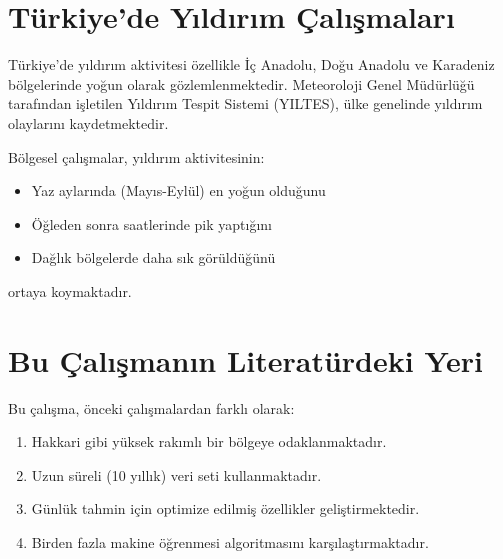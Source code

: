 \section{Türkiye'de Yıldırım Çalışmaları}

Türkiye'de yıldırım aktivitesi özellikle İç Anadolu, Doğu Anadolu ve Karadeniz bölgelerinde yoğun olarak gözlemlenmektedir. Meteoroloji Genel Müdürlüğü tarafından işletilen Yıldırım Tespit Sistemi (YILTES), ülke genelinde yıldırım olaylarını kaydetmektedir.

Bölgesel çalışmalar, yıldırım aktivitesinin:
\begin{itemize}
    \item Yaz aylarında (Mayıs-Eylül) en yoğun olduğunu
    \item Öğleden sonra saatlerinde pik yaptığını
    \item Dağlık bölgelerde daha sık görüldüğünü
\end{itemize}
ortaya koymaktadır.

\section{Bu Çalışmanın Literatürdeki Yeri}

Bu çalışma, önceki çalışmalardan farklı olarak:

\begin{enumerate}
    \item Hakkari gibi yüksek rakımlı bir bölgeye odaklanmaktadır.
    \item Uzun süreli (10 yıllık) veri seti kullanmaktadır.
    \item Günlük tahmin için optimize edilmiş özellikler geliştirmektedir.
    \item Birden fazla makine öğrenmesi algoritmasını karşılaştırmaktadır.
\end{enumerate}
